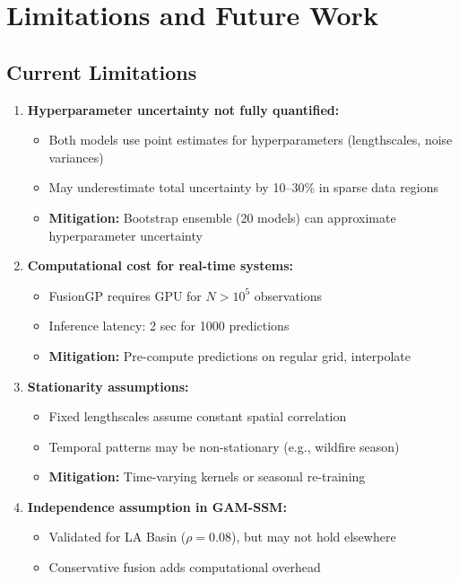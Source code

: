 \documentclass[11pt,letterpaper]{article}
\begin{document}
\section{Limitations and Future Work} \label{sec:limitations}

\subsection{Current Limitations}

\begin{enumerate}
    \item \textbf{Hyperparameter uncertainty not fully quantified:}
    \begin{itemize}
        \item Both models use point estimates for hyperparameters (lengthscales, noise variances)
        \item May underestimate total uncertainty by 10--30\% in sparse data regions
        \item \textbf{Mitigation:} Bootstrap ensemble (20 models) can approximate hyperparameter uncertainty
    \end{itemize}

    \item \textbf{Computational cost for real-time systems:}
    \begin{itemize}
        \item FusionGP requires GPU for $N > 10^5$ observations
        \item Inference latency: 2 sec for 1000 predictions
        \item \textbf{Mitigation:} Pre-compute predictions on regular grid, interpolate
    \end{itemize}

    \item \textbf{Stationarity assumptions:}
    \begin{itemize}
        \item Fixed lengthscales assume constant spatial correlation
        \item Temporal patterns may be non-stationary (e.g., wildfire season)
        \item \textbf{Mitigation:} Time-varying kernels or seasonal re-training
    \end{itemize}

    \item \textbf{Independence assumption in GAM-SSM:}
    \begin{itemize}
        \item Validated for LA Basin ($\rho = 0.08$), but may not hold elsewhere
        \item Conservative fusion adds computational overhead
    \end{itemize}
\end{enumerate}
\end{document}
